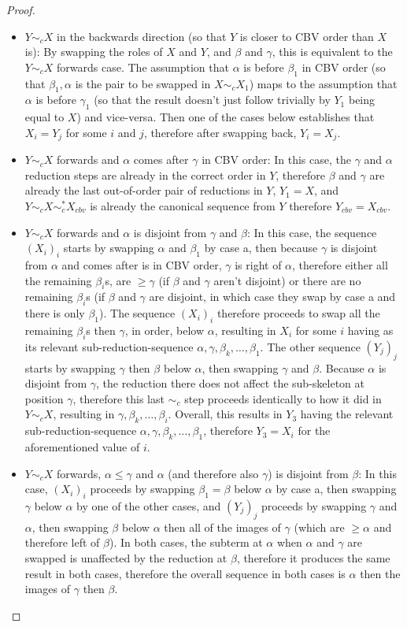 \documentclass{article}
\theoremstyle{definition}
\theoremstyle{lemma}
\theoremstyle{remark}
\begin{document}
\begin{proof}
\begin{itemize}
  \item $Y \sim_c X$ in the backwards direction (so that $Y$ is closer to CBV order than $X$ is): By swapping the roles of $X$ and $Y$, and $\beta$ and $\gamma$, this is equivalent to the $Y \sim_c X$ forwards case. The assumption that $\alpha$ is before $\beta_1$ in CBV order (so that $\beta_1, \alpha$ is the pair to be swapped in $X \sim_c X_1$) maps to the assumption that $\alpha$ is before $\gamma_1$ (so that the result doesn't just follow trivially by $Y_1$ being equal to $X$) and vice-versa. Then one of the cases below establishes that $X_i = Y_j$ for some $i$ and $j$, therefore after swapping back, $Y_i = X_j$.
\item $Y \sim_c X$ forwards and $\alpha$ comes after $\gamma$ in CBV order: In this case, the $\gamma$ and $\alpha$ reduction steps are already in the correct order in $Y$, therefore $\beta$ and $\gamma$ are already the last out-of-order pair of reductions in $Y$, $Y_1 = X$, and $Y \sim_c X \sim_c^* X_{cbv}$ is already the canonical sequence from $Y$ therefore $Y_{cbv} = X_{cbv}$.
\item $Y \sim_c X$ forwards and $\alpha$ is disjoint from $\gamma$ and $\beta$: In this case, the sequence $(X_i)_i$ starts by swapping $\alpha$ and $\beta_1$ by case a, then because $\gamma$ is disjoint from $\alpha$ and comes after is in CBV order, $\gamma$ is right of $\alpha$, therefore either all the remaining $\beta_i$s, are $\geq \gamma$ (if $\beta$ and $\gamma$ aren't disjoint) or there are no remaining $\beta_i$s (if $\beta$ and $\gamma$ are disjoint, in which case they swap by case a and there is only $\beta_1$). The sequence $(X_i)_i$ therefore proceeds to swap all the remaining $\beta_i$s then $\gamma$, in order, below $\alpha$, resulting in $X_i$ for some $i$ having as its relevant sub-reduction-sequence $\alpha, \gamma, \beta_k, \dots, \beta_1$. The other sequence $(Y_j)_j$ starts by swapping $\gamma$ then $\beta$ below $\alpha$, then swapping $\gamma$ and $\beta$. Because $\alpha$ is disjoint from $\gamma$, the reduction there does not affect the sub-skeleton at position $\gamma$, therefore this last $\sim_c$ step proceeds identically to how it did in $Y \sim_c X$, resulting in $\gamma, \beta_k, \dots, \beta_i$. Overall, this results in $Y_3$ having the relevant sub-reduction-sequence $\alpha, \gamma, \beta_k, \dots, \beta_1$, therefore $Y_3 = X_i$ for the aforementioned value of $i$.
\item $Y \sim_c X$ forwards, $\alpha \leq \gamma$ and $\alpha$ (and therefore also $\gamma$) is disjoint from $\beta$: In this case, $(X_i)_i$ proceeds by swapping $\beta_1 = \beta$ below $\alpha$ by case a, then swapping $\gamma$ below $\alpha$ by one of the other cases, and $(Y_j)_j$ proceeds by swapping $\gamma$ and $\alpha$, then swapping $\beta$ below $\alpha$ then all of the images of $\gamma$ (which are $\geq \alpha$ and therefore left of $\beta$). In both cases, the subterm at $\alpha$ when $\alpha$ and $\gamma$ are swapped is unaffected by the reduction at $\beta$, therefore it produces the same result in both cases, therefore the overall sequence in both cases is $\alpha$ then the images of $\gamma$ then $\beta$.

\end{itemize}
\end{proof}
\end{document}
